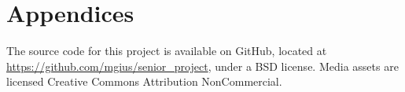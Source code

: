 \documentclass[11pt]{article}
\begin{document}

\section{Appendices}

The source code for this project is available on GitHub, located at \url{https://github.com/mgius/senior_project}, under a BSD license.  Media assets are licensed Creative Commons Attribution NonCommercial.





\end{document}

